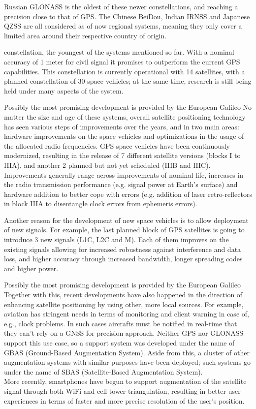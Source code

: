 Russian GLONASS is the oldest of these newer constellations, and reaching a
precision close to that of GPS. The Chinese BeiDou, Indian IRNSS and Japanese
QZSS are all considered as of now regional systems, meaning they only cover a
limited area around their respective country of origin.

constellation, the youngest of the systems mentioned so far. With a nominal
accuracy of 1 meter for civil signal it promises to outperform the current GPS
capabilities. This constellation is currently operational with 14 satellites,
with a planned constellation of 30 space vehicles; at the same time, research is
still being held under many aspects of the system.

\vspace{\baselineskip}

Possibly the most promising development is provided by the European Galileo
No matter the size and age of these systems, overall satellite positioning
technology has seen various steps of improvements over the years, and in two
main areas: hardware improvements on the space vehicles and optimizations in the
usage of the allocated radio frequencies. GPS space vehicles have been
continuously modernized, resulting in the release of 7 different satellite
versions (blocks I to IIIA), and another 2 planned but not yet scheduled (IIIB
and IIIC). Improvements generally range across improvements of nominal life,
increases in the radio transmission performance (e.g. signal power at Earth's
surface) and hardware addition to better cope with errors (e.g. addition of
laser retro-reflectors in block IIIA to disentangle clock errors from ephemeris
errors). 

Another reason for the development of new space vehicles is to allow
deployment of new signals. For example, the last planned block of GPS satellites
is going to introduce 3 new signals (L1C, L2C and M). Each of them improves
on the existing signals allowing for increased robustness against interference
and data loss, and higher accuracy through increased bandwidth, longer spreading
codes and higher power.

\vspace{\baselineskip}

Possibly the most promising development is provided by the European Galileo
Together with this, recent developments have also happened in the direction of
enhancing satellite positioning by using other, more local sources. For example,
aviation has stringent needs in terms of monitoring and client warning in case
of, e.g., clock problems. In such cases aircrafts must be notified in real-time
that they can't rely on a GNSS for precision approach. Neither GPS nor GLONASS
support this use case, so a support system was developed under the name of GBAS
(Ground-Based Augmentation System). Aside from this, a cluster of other
augmentation systems with similar purposes have been deployed; such systems go
under the name of SBAS (Satellite-Based Augmentation System).\\
More recently, smartphones have begun to support augmentation of the satellite
signal through both WiFi and cell tower triangulation, resulting in better user
experiences in terms of faster and more precise resolution of the user's
position.

